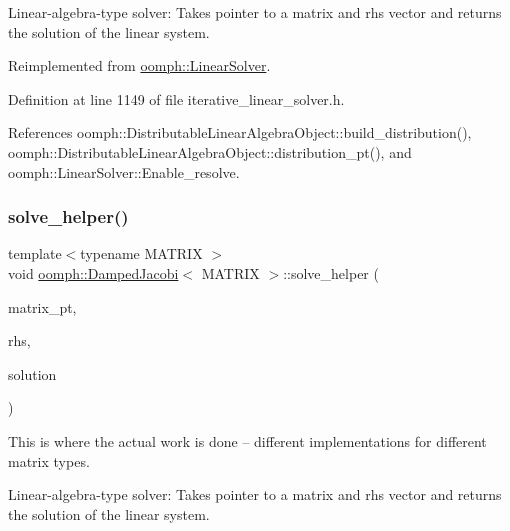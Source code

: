 Linear-\/algebra-\/type solver\+: Takes pointer to a matrix and rhs vector and returns the solution of the linear system. 



Reimplemented from \hyperlink{classoomph_1_1LinearSolver_a546c09822d18191df14caed864c04c09}{oomph\+::\+Linear\+Solver}.



Definition at line 1149 of file iterative\+\_\+linear\+\_\+solver.\+h.



References oomph\+::\+Distributable\+Linear\+Algebra\+Object\+::build\+\_\+distribution(), oomph\+::\+Distributable\+Linear\+Algebra\+Object\+::distribution\+\_\+pt(), and oomph\+::\+Linear\+Solver\+::\+Enable\+\_\+resolve.

\mbox{\label{classoomph_1_1DampedJacobi_a8293439927a99030a1508f268be8a876}} 
\subsubsection{\texorpdfstring{solve\+\_\+helper()}{solve\_helper()}}
{\footnotesize\ttfamily template$<$typename M\+A\+T\+R\+IX $>$ \\
void \hyperlink{classoomph_1_1DampedJacobi}{oomph\+::\+Damped\+Jacobi}$<$ M\+A\+T\+R\+IX $>$\+::solve\+\_\+helper (\begin{DoxyParamCaption}\item[{\hyperlink{classoomph_1_1DoubleMatrixBase}{Double\+Matrix\+Base} $\ast$const \&}]{matrix\+\_\+pt,  }\item[{const \hyperlink{classoomph_1_1DoubleVector}{Double\+Vector} \&}]{rhs,  }\item[{\hyperlink{classoomph_1_1DoubleVector}{Double\+Vector} \&}]{solution }\end{DoxyParamCaption})\hspace{0.3cm}{\ttfamily [private]}}



This is where the actual work is done -- different implementations for different matrix types. 

Linear-\/algebra-\/type solver\+: Takes pointer to a matrix and rhs vector and returns the solution of the linear system. 

